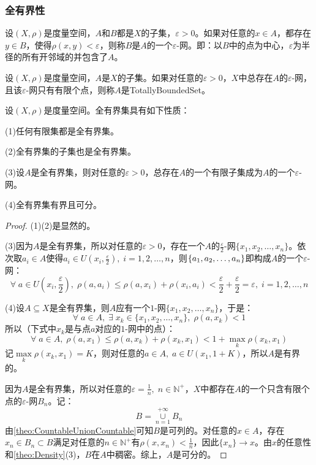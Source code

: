 \subsubsection{全有界性}
\begin{definition}
	设$(X,\rho)$是度量空间，$A$和$B$都是$X$的子集，$\varepsilon>0$。如果对任意的$x\in A$，都存在$y\in B$，使得$\rho(x,y)<\varepsilon$，则称$B$是$A$的一个$\varepsilon$-网。即：以$B$中的点为中心，$\varepsilon$为半径的所有开邻域的并包含了$A$。
\end{definition}
\begin{definition}
	设$(X,\rho)$是度量空间，$A$是$X$的子集。如果对任意的$\varepsilon>0$，$X$中总存在$A$的$\varepsilon$-网，且该$\varepsilon$-网只有有限个点，则称$A$是\gls{TotallyBoundedSet}。
\end{definition}
\begin{property}\label{prop:TotallyBoundedSet}
	设$(X,\rho)$是度量空间。全有界集具有如下性质：\par
	(1)任何有限集都是全有界集。\par
	(2)全有界集的子集也是全有界集。\par
	(3)设$A$是全有界集，则对任意的$\varepsilon>0$，总存在$A$的一个有限子集成为$A$的一个$\varepsilon$-网。\par
	(4)全有界集有界且可分。
\end{property}
\begin{proof}
	(1)(2)是显然的。\par
	(3)因为$A$是全有界集，所以对任意的$\varepsilon>0$，存在一个$A$的$\frac{\varepsilon}{2}$-网$\{x_1,x_2,\dots,x_n\}$。依次取$a_i\in A$使得$a_i\in U(x_i,\frac{\varepsilon}{2}),\;i=1,2,\dots,n$，则$\{a_1, a_2, \dots, a_{n}\}$即构成$A$的一个$\varepsilon$-网：
	\begin{equation*}
		\forall\;a\in U\left(x_i,\frac{\varepsilon}{2}\right),\;\rho(a,a_i)\leqslant\rho(a,x_i)+\rho(x_i,a_i)<\frac{\varepsilon}{2}+\frac{\varepsilon}{2}=\varepsilon,\;i=1,2,\dots,n
	\end{equation*}\par
	(4)设$A\subseteq X$是全有界集，则$A$应有一个$1$-网$\{x_1,x_2,\dots,x_n\}$，于是：
	\begin{equation*}
		\forall\;a\in A,\;\exists\;x_{k}\in\{x_1,x_2,\dots,x_n\},\;\rho(a,x_k)<1
	\end{equation*}
	所以（下式中$x_k$是与点$a$对应的$1$-网中的点）：
	\begin{equation*}
		\forall\;a\in A,\;\rho(a,x_1)\leqslant\rho(a,x_k)+\rho(x_k,x_1)<1+\max_{k}\rho(x_k,x_1)
	\end{equation*}
	记$\max\limits_{k}\rho(x_k,x_1)=K$，则对任意的$a\in A,\;a\in U(x_1,1+K)$，所以$A$是有界的。\par
	因为$A$是全有界集，所以对任意的$\varepsilon=\frac{1}{n},\;n\in\mathbb{N}^+$，$X$中都存在$A$的一个只含有限个点的$\varepsilon$-网$B_n$。记：
	\begin{equation*}
		B=\underset{n=1}{\overset{+\infty}{\cup}}B_n
	\end{equation*}
	由\cref{theo:CountableUnionCountable}可知$B$是可列的。对任意的$x\in A$，存在$x_n\in B_n\subset B$满足对任意的$n\in\mathbb{N}^+$有$\rho(x,x_n)<\frac{1}{n}$，因此$\{x_n\}\to x$。由$x$的任意性和\cref{theo:Density}(3)，$B$在$A$中稠密。综上，$A$是可分的。
\end{proof}
